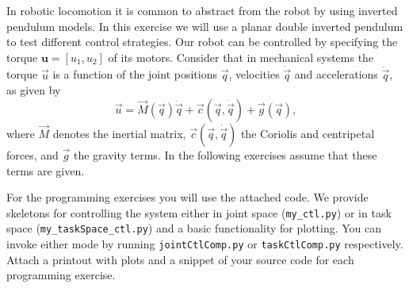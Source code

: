 In robotic locomotion it is common to abstract from the robot by using inverted pendulum models.
In this exercise we will use a planar double inverted pendulum to test different control strategies. Our robot can be controlled by specifying the torque $\mathbf{u}=[u_1, u_2]$ of its motors. Consider that in mechanical systems the torque $\vec{u}$ is a function of the joint positions $\vec{q}$, velocities $\dot{\vec{q}}$ and accelerations $\ddot{\vec{q}}$, as given by  
\[
\vec{u}=\vec{M}(\vec{q})\ddot{\vec{q}}+\vec{c}(\vec{q},\dot{\vec{q}})+\vec{g}(\vec{q}), 
\] 
where $\vec{M}$ denotes the inertial matrix, $\vec{c}(\vec{q},\dot{\vec{q}})$ the Coriolis and centripetal forces, and $\vec{g}$ the gravity terms. In the following exercises assume that these terms are given.

For the programming exercises you will use the attached code. 
We provide skeletons for controlling the system either in joint space (\texttt{my\_ctl.py}) or in task space (\texttt{my\_taskSpace\_ctl.py}) and a basic functionality for plotting. You can invoke either mode by running \texttt{jointCtlComp.py} or \texttt{taskCtlComp.py} respectively. 
Attach a printout with plots and a snippet of your source code for each programming exercise. 

